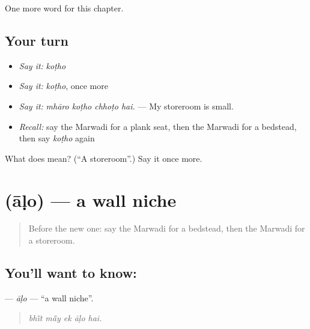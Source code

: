 \begin{grammarlens}[title={What you've built}]
One more word for this chapter.
\end{grammarlens}

\subsection*{Your turn}
\begin{itemize}
\raggedright
  \item \emph{Say it:} \emph{koṭho}
  \item \emph{Say it:} \emph{koṭho}, once more
  \item \emph{Say it:} \emph{mhāro koṭho chhoṭo hai.} — My storeroom is small.
  \item \emph{Recall:} say the Marwadi for a plank seat, then the Marwadi for a bedstead, then say \emph{koṭho} again
\end{itemize}

\begin{tcolorbox}[breakable,colback=teal!4,colframe=teal!35!black,title={Before you move on}]
What does  mean? (\textquotedblleft{}A storeroom\textquotedblright{}.) Say it once more.
\end{tcolorbox}
\section[\texorpdfstring{\mw{आळो} (āḷo)}{आळो (āḷo)}]{ (āḷo) — a wall niche}

\label{lesson:MW-C187-alo}



\begin{quote}
Before the new one: say the Marwadi for a bedstead, then the Marwadi for a storeroom.
\end{quote}

\subsection*{You'll want to know: }
\textbf{} — \emph{āḷo} — \textquotedblleft{}a wall niche\textquotedblright{}.

\begin{quote}
    
\end{quote}

\begin{quote}
\emph{bhī̃t mā̃y ek āḷo hai.}
\end{quote}

